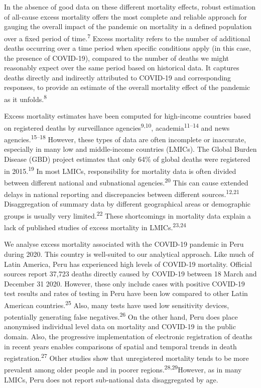 \documentclass[
]{article}
\begin{document}
In the absence of good data on these different mortality effects, robust estimation of all-cause excess mortality offers the most complete and reliable approach for gauging the overall impact of the pandemic on mortality in a defined population over a fixed period of time.\textsuperscript{7} Excess mortality refers to the number of additional deaths occurring over a time period when specific conditions apply (in this case, the presence of COVID-19), compared to the number of deaths we might reasonably expect over the same period based on historical data. It captures deaths directly and indirectly attributed to COVID-19 and corresponding responses, to provide an estimate of the overall mortality effect of the pandemic as it unfolds.\textsuperscript{8}

Excess mortality estimates have been computed for high-income countries based on registered deaths by surveillance agencies\textsuperscript{9,10}, academia\textsuperscript{11--14} and news agencies.\textsuperscript{15--18} However, these types of data are often incomplete or inaccurate, especially in many low and middle-income countries (LMICs). The Global Burden Disease (GBD) project estimates that only 64\% of global deaths were registered in 2015.\textsuperscript{19} In most LMICs, responsibility for mortality data is often divided between different national and subnational agencies.\textsuperscript{20} This can cause extended delays in national reporting and discrepancies between different sources.\textsuperscript{12,21} Disaggregation of summary data by different geographical areas or demographic groups is usually very limited.\textsuperscript{22} These shortcomings in mortality data explain a lack of published studies of excess mortality in LMICs.\textsuperscript{23,24}

We analyse excess mortality associated with the COVID-19 pandemic in Peru during 2020. This country is well-suited to our analytical approach. Like much of Latin America, Peru has experienced high levels of COVID-19 mortality. Official sources report 37,723 deaths directly caused by COVID-19 between 18 March and December 31 2020. However, these only include cases with positive COVID-19 test results and rates of testing in Peru have been low compared to other Latin American countries.\textsuperscript{25} Also, many tests have used low sensitivity devices, potentially generating false negatives.\textsuperscript{26} On the other hand, Peru does place anonymised individual level data on mortality and COVID-19 in the public domain. Also, the progressive implementation of electronic registration of deaths in recent years enables comparisons of spatial and temporal trends in death registration.\textsuperscript{27} Other studies show that unregistered mortality tends to be more prevalent among older people and in poorer regions.\textsuperscript{28,29}However, as in many LMICs, Peru does not report sub-national data disaggregated by age.
\end{document}
